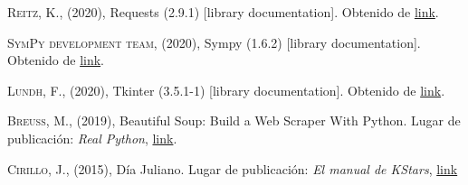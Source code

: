 \documentclass[11pt]{book}
\begin{document}
\begin{thebibliography}{99}
 \textsc{Reitz, K.}, (2020), Requests (2.9.1) [library documentation]. Obtenido de \href{https://requests.readthedocs.io/_/downloads/es/es/latest/pdf/}{link}.

 \textsc{SymPy development team}, (2020), Sympy (1.6.2) [library documentation]. Obtenido de \href{https://docs.sympy.org/latest/index.html}{link}.

 \textsc{Lundh, F.}, (2020), Tkinter (3.5.1-1) [library documentation]. Obtenido de \href{https://docs.python.org/3/library/tk.html}{link}.

 \textsc{Breuss, M.}, (2019), Beautiful Soup: Build a Web Scraper With Python. Lugar de publicación: \textit{Real Python}, \href{https://realpython.com/beautiful-soup-web-scraper-python/}{link}.

 \textsc{Cirillo, J.}, (2015), Día Juliano. Lugar de publicación: \textit{El manual de KStars}, \href{https://docs.kde.org/trunk5/es/extragear-edu/kstars/ai-julianday.html#:~:text=El%20n%C3%BAmero%20de%20d%C3%ADas%20se,n%C3%BAmeros%20de%20sus%20d%C3%ADas%20julianos.}{link}


\end{thebibliography}
\end{document}
